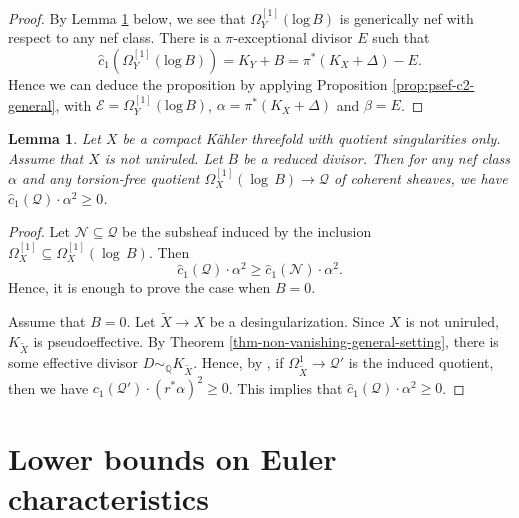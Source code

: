\documentclass[12pt]{amsart}
\newcommand{\<}{\leq}
\def\>{\geq}
\newcommand{\D}{\Delta}
\def\mcE{\mathcal{E}}
\def\mcN{\mathcal{N}}
\newtheorem{lemma}[theorem]{Lemma}
\theoremstyle{remark}
\theoremstyle{definition}
\theoremstyle{definition}
\numberwithin{equation}{section}
\theoremstyle{definition}
\theoremstyle{definition}
\begin{document}
 

\begin{proof}
By Lemma \ref{lemma:generic-nef-non-uniruled} below, we see that $\Omega_Y^{[1]}(\mathrm{log}\,  B)$ is generically nef with respect to   any nef class.   
There is a $\pi$-exceptional divisor $E$ such that  
\[\hat{c}_1(\Omega_Y^{[1]}(\mathrm{log}\,  B)) = K_Y+ B =  \pi^*(K_X+ \D) - E.\] 
Hence we can deduce the proposition by applying Proposition \ref{prop:psef-c2-general}, with $\mcE= \Omega_{Y}^{[1]}(\mathrm{log}\, B)$,  $\alpha=   \pi^*(K_X+\D)$ and $\beta=E$.
\end{proof}



\begin{lemma}
\label{lemma:generic-nef-non-uniruled}
Let $X$ be a compact K\"ahler threefold with quotient singularities only. 
Assume that $X$ is not uniruled. 
Let $B$ be a reduced divisor. 
Then for any nef class $\alpha$ and any  torsion-free quotient $\Omega_X^{[1]}(\log\, B) \to \mathcal{Q}$ of coherent sheaves, we have $\hat{c}_1(\mathcal{Q})\cdot \alpha^2   \> 0$.
\end{lemma}

\begin{proof}
Let $\mcN\subseteq \mathcal{Q}$ be the subsheaf induced by the inclusion $\Omega_X^{[1]} \subseteq \Omega_X^{[1]}(\log\, B)$. 
Then 
\[
 \hat{c}_1(\mathcal{Q})\cdot \alpha^2   \>   \hat{c}_1(\mathcal{N})\cdot \alpha^2. 
\]
Hence, it is enough to prove the case when $B=0$.

Assume that $B=0$. 
Let $\widetilde{X} \to X$ be a desingularization. 
Since $X$ is not uniruled, $K_{\widetilde{X}}$ is pseudoeffective. 
By Theorem \ref{thm-non-vanishing-general-setting}, there is some effective divisor $D\sim_{\mathbb{Q}} K_{\widetilde{X}}$. 
Hence, by \cite[Theorem 1.4]{Enoki1988}, if $\Omega^1_{\widetilde{X}} \to \mathcal{Q}'$ is the induced quotient, then we have  $c_1(\mathcal{Q}') \cdot (r^*\alpha)^2 \> 0$. 
This implies that 
$\hat{c}_1(\mathcal{Q})\cdot \alpha^2   \> 0$.
\end{proof}









\section{Lower bounds on Euler characteristics}
\label{section:Euler-char}
 
\end{document}
